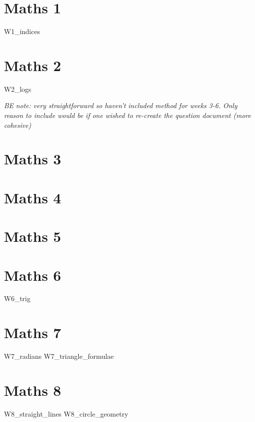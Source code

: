 \documentclass[12pt]{exam}
\begin{document}
\tableofcontents
\newpage

\section{Maths 1}
{W1_indices}

\newpage
\section{Maths 2}
{W2_logs}

\newpage
\textit{BE note: very straightforward so haven't included method for weeks 3-6.
Only reason to include would be if one wished to re-create the question 
document (more cohesive)}
\section{Maths 3}
\section{Maths 4}
\section{Maths 5}
\section{Maths 6}
{W6_trig}

\newpage
\section{Maths 7}
{W7_radians}
\newpage
{W7_triangle_formulae}

\newpage
\section{Maths 8}
{W8_straight_lines}
\newpage
{W8_circle_geometry}
\end{document}
